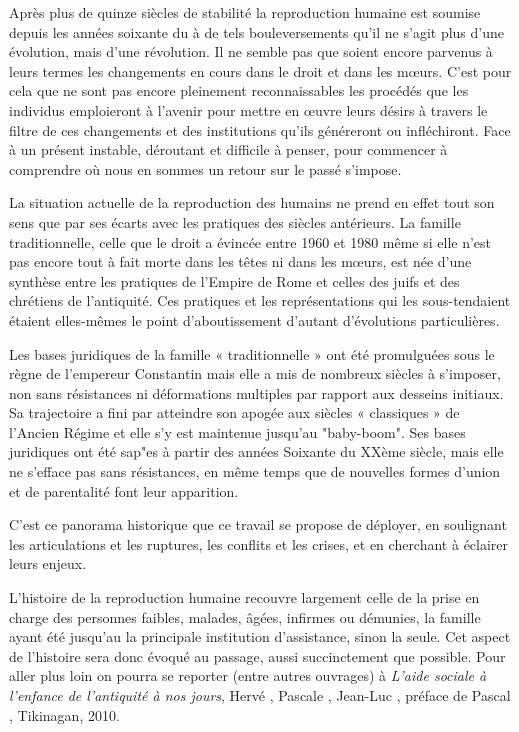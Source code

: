 Après plus de quinze siècles de stabilité la reproduction humaine
est soumise depuis les années soixante du  à de tels bouleversements
qu'il ne s'agit plus d'une évolution, mais d'une révolution. Il
ne semble pas que soient encore  parvenus à leurs termes les changements en
cours dans le droit et dans les mœurs. C'est pour cela que ne sont pas
encore pleinement reconnaissables les procédés que les individus emploieront
à l'avenir pour mettre en œuvre leurs désirs à travers le filtre
de ces changements et des institutions qu'ils généreront ou infléchiront.
Face à un présent instable, déroutant et difficile à penser, pour commencer à
comprendre où nous en sommes
 un retour sur le passé s'impose.

La situation actuelle de la reproduction des humains ne prend en
effet tout son sens que par ses écarts avec les pratiques des siècles antérieurs.
La famille traditionnelle, celle que le droit a évincée entre 1960 et
1980 même si elle n'est pas encore tout à fait morte dans les têtes ni dans les mœurs, est
née d'une synthèse entre les pratiques de l'Empire de Rome et celles des
juifs et des chrétiens de l'antiquité. Ces pratiques et les représentations
qui les sous-tendaient étaient elles-mêmes le point d'aboutissement
d'autant d'évolutions particulières.

Les bases juridiques de la famille « traditionnelle » ont été promulguées sous le règne
de l'empereur Constantin mais elle a mis de nombreux
siècles à s'imposer, non sans résistances ni déformations multiples par
rapport aux desseins initiaux. Sa trajectoire a fini par atteindre son apogée aux siècles « classiques »
de l'Ancien Régime et elle s'y est maintenue jusqu'au "baby-boom". Ses bases juridiques ont été sap"es à partir des années Soixante du XXème siècle, mais elle ne s'efface pas sans résistances, en
même temps que de nouvelles formes d'union et de parentalité font leur
apparition.

C'est ce panorama historique que ce travail se propose de déployer, en soulignant les articulations et les ruptures, les
conflits et les crises, et en cherchant à éclairer leurs enjeux.

L'histoire de la reproduction humaine recouvre largement celle
de la prise en charge des personnes faibles, malades, âgées, infirmes ou
démunies, la famille ayant été jusqu'au  la principale institution
d'assistance, sinon la seule. Cet aspect de l'histoire sera donc évoqué
au passage, aussi succinctement que possible. Pour aller plus loin on
pourra se reporter (entre autres ouvrages) à \emph{L'aide sociale à l'enfance de l'antiquité à
nos jours},%
Hervé , Pascale , Jean-Luc ,
préface de Pascal , Tikinagan, 2010.

